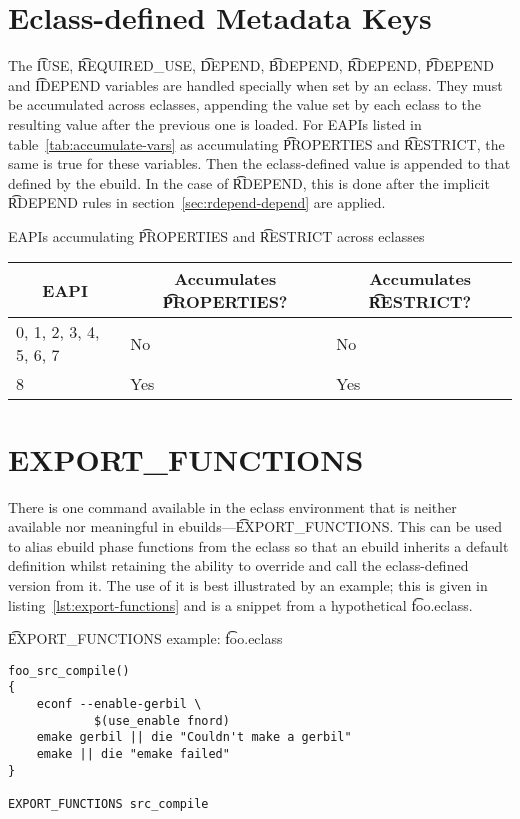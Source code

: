 \section{Eclass-defined Metadata Keys}

 The \t{IUSE}, \t{REQUIRED_USE}, \t{DEPEND}, \t{BDEPEND}, \t{RDEPEND},
\t{PDEPEND} and \t{IDEPEND} variables are handled specially when set by an eclass. They must be
accumulated across eclasses, appending the value set by each eclass to the resulting value after
the previous one is loaded. For EAPIs listed in table~\ref{tab:accumulate-vars} as accumulating
\t{PROPERTIES} and \t{RESTRICT}, the same is true for these variables. Then the eclass-defined
value is appended to that defined by the ebuild. In the case of \t{RDEPEND}, this is done after
the implicit \t{RDEPEND} rules in section~\ref{sec:rdepend-depend} are applied.

\begin{centertable}{EAPIs accumulating \t{PROPERTIES} and \t{RESTRICT} across eclasses}
    \label{tab:accumulate-vars}
    \begin{tabular}{lll}
      \toprule
      \multicolumn{1}{c}{\textbf{EAPI}} &
      \multicolumn{1}{c}{\textbf{Accumulates \t{PROPERTIES}?}} &
      \multicolumn{1}{c}{\textbf{Accumulates \t{RESTRICT}?}} \\
      \midrule
      0, 1, 2, 3, 4, 5, 6, 7  & No  & No  \\
      8                       & Yes & Yes \\
      \bottomrule
    \end{tabular}
\end{centertable}

\section{EXPORT_FUNCTIONS}

There is one command available in the eclass environment that is neither available nor meaningful
in ebuilds---\t{EXPORT_FUNCTIONS}\@. This can be used to alias ebuild phase functions from the
eclass so that an ebuild inherits a default definition whilst retaining the ability to override and
call the eclass-defined version from it. The use of it is best illustrated by an example; this is
given in listing~\ref{lst:export-functions} and is a snippet from a hypothetical \t{foo.eclass}.

\begin{listing}
\caption{\t{EXPORT_FUNCTIONS} example: \t{foo.eclass}} \label{lst:export-functions}
\begin{verbatim}
foo_src_compile()
{
    econf --enable-gerbil \
            $(use_enable fnord)
    emake gerbil || die "Couldn't make a gerbil"
    emake || die "emake failed"
}

EXPORT_FUNCTIONS src_compile
\end{verbatim}
\end{listing}


